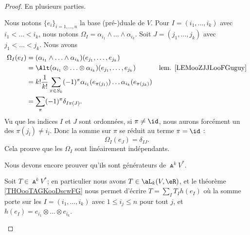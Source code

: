 \begin{proof}
	En plusieurs parties.
	\begin{subproof}
		Nous notons \( \{ e_i \}_{i=1,\ldots,n}\) la base (pré-)duale de \( V\). Pour \( I=(i_1,\ldots,i_k)\) avec \( i_1<\ldots< i_k\), nous notons \( \Omega_I=\alpha_{i_1}\wedge\ldots\wedge \alpha_{i_k}\). Soit \( J=(j_1,\ldots,j_k)\) avec \( j_1<\ldots <j_k\). Nous avons
		\begin{subequations}
			\begin{align}
				\Omega_I(e_I) & =(\alpha_{i_1}\wedge\ldots\wedge \alpha_{i_k})(e_{j_1},\ldots, e_{j_k})                                                                       \\
				              & = \Alt(\alpha_{i_1}\otimes\ldots\otimes \alpha_{i_k})(e_{j_1},\ldots, e_{j_k})                          & \text{lem. \ref{LEMooZJJLooFGuguy}} \\
				              & = k!\frac{1}{ k!}\sum_{\pi\in S_k}(-1)^{\pi}\alpha_{i_1}(e_{\pi(j_1)})\ldots \alpha_{i_k}(e_{\pi(j_k)})                                       \\
				              & =\sum_{\pi}(-1)^{\pi}\delta_{I\pi(J)}.
			\end{align}
		\end{subequations}
		Vu que les indices \( I\) et \( J\) sont ordonnées, si \( \pi\neq \id\), nous aurons forcément un des \( \pi(j_l)\neq i_l\). Donc la somme sur \( \pi\) se réduit au terme \( \pi=\id\) :
		\begin{equation}	\label{EQooFTUIooDDgxLK}
			\Omega_I(e_J)=\delta_{IJ}.
		\end{equation}
		Cela prouve que les \( \Omega_I\) sont linéairement indépendants.



		Nous devons encore prouver qu'ils sont générateurs de \( \Wedge^kV^*\).

		Soit \( T\in \Wedge^kV^*\); en particulier nous avons \( T\in\aL_k(V,\eR)\), et le théorème \ref{THOooTAGKooDscwFG} nous permet d'écrire \( T=\sum_IT_Ih(e_I)\) où la somme porte sur les \( I=(i_1,\ldots,i_k)\) avec \( 1\leq i_j\leq n\) pour tout \( j\), et \( h(e_I)=e_{i_1}\otimes\ldots\otimes e_{i_k}\).


\end{subproof}
\end{proof}
